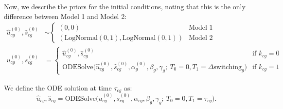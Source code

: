 \documentclass[
  sn-mathphys-num,
  lineno,
  twocolumn]{sn-jnl}
\begin{document}
Now, we describe the priors for the initial conditions, noting that this
is the only difference between Model 1 and Model 2: \begin{align}
  \hat{u}^{(0)}_{cg}, \hat{s}^{(0)}_{cg} &\sim \begin{cases}
    (0, 0) & \text{Model 1} \\
    (\text{LogNormal}(0, 1), \text{LogNormal}(0, 1)) & \text{Model 2}
  \end{cases} \\
  u^{(0)}_{cg}, s^{(0)}_{cg} &= \begin{cases}
    \hat{u}^{(0)}_{cg}, \hat{s}^{(0)}_{cg} & \text{if } k_{cg} = 0 \\
    \textrm{ODESolve}\Big( \hat{u}^{(0)}_{cg}, \hat{s}^{(0)}_{cg}, \alpha^{(0)}_g, \beta_g, \gamma_g; \ T_0=0, T_1=\Delta \textrm{switching}_g \Big) & \text{if } k_{cg} = 1
  \end{cases}
\end{align}

We define the ODE solution at time \(\tau_{cg}\) as: \begin{equation}
  \label{eq-ODE-solve}
    \hat{u}_{cg}, \hat{s}_{cg} = \text{ODESolve}\Big( u^{(0)}_{cg}, s^{(0)}_{cg}, \alpha_{cg}, \beta_g, \gamma_g; \ T_0=0, T_1=\tau_{cg} \Big).
\end{equation}
\end{document}
